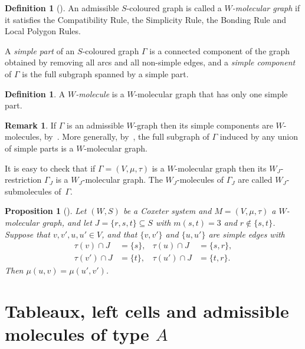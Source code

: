 \documentclass[10pt]{amsart}
\newtheorem{prop}[theo]{Proposition}
\theoremstyle{definition}
\newtheorem{defi}[theo]{Definition}
\newtheorem{rema}[theo]{Remark}
\newcommand{\citex}[2]{\cite[#1]{#2}}
\begin{document}
\begin{defi}[{\citex{Definition~3.3}{stem:morewgraph}}]\label{moleculargraph}
An admissible $S$-coloured graph is called a \emph{$W\!$-molecular graph} if it satisfies the
Compatibility Rule, the Simplicity Rule, the Bonding Rule and Local Polygon Rules.
\end{defi}
A \emph{simple part} of an $S$-coloured graph $\Gamma$ is a connected
component of the graph obtained by removing all arcs and all non-simple edges,
and a \emph{simple component} of $\Gamma$ is the full subgraph spanned by a
simple part.

\begin{defi}\label{molecule}
A \emph{$W\!$-molecule} is a $W\!$-molecular graph that has only
one simple part.
\end{defi}

\begin{rema}\label{WgraphisWmoleculargraph}
If $\Gamma$ is an admissible $W\!$-graph then its simple components are
$W\!$-molecules, by~\cite[Fact~3.1]{stem:morewgraph}.
More generally, by~\cite[Fact~3.2]{stem:morewgraph}, the full subgraph of
$\Gamma$ induced by any union of simple parts is a $W\!$-molecular graph.
\end{rema}

It is easy to check that if $\Gamma=(V,\mu,\tau)$ is a $W\!$-molecular graph
then its $W_J$-restriction $\Gamma_{J}$ is a $W_J$-molecular graph.
The $W_J$-molecules of $\Gamma_J$ are called $W_J$-submolecules
of~$\Gamma$.

\begin{prop}[{\citex{Lemma~1}{ChuMic:typeAMol}}]\label{arctransport}
Let $(W,S)$ be a Coxeter system and $M=(V,\mu,\tau)$
a $W\!$-molecular graph, and let $J=\{r,s,t\}\subseteq S$ with
$m(s,t)=3$ and $r\notin\{s,t\}$. Suppose that $v,v',u,u'\in V$,
and that $\{v,v'\}$ and $\{u,u'\}$ are simple edges with
\begin{align*}
\qquad&&\tau(v)\cap J &= \{s\},&\tau(u)\cap J &= \{s,r\},&&\qquad\\[-1.5pt]
\qquad&&\tau(v')\cap J &= \{t\},&\tau(u')\cap J &= \{t,r\}.&&\qquad
\end{align*}
Then $\mu(u,v) = \mu(u',v')$.
\end{prop}

\section{Tableaux, left cells and admissible molecules of type \texorpdfstring{$A$}{A}}
\label{sec:6}
\end{document}
